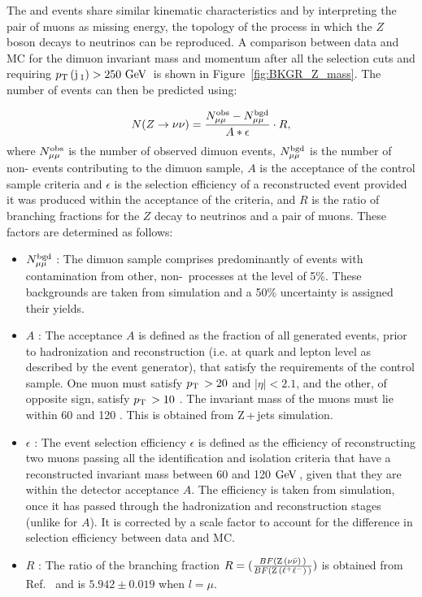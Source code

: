 The \zmumu and \znunu events share similar kinematic characteristics and by interpreting the pair of muons as missing energy, the topology of the process in which the $Z$ boson decays to neutrinos can be reproduced.  
A comparison between data and MC for the dimuon invariant mass and momentum after all the selection cuts and requiring $p_{\text{T}}\,({\rm j}\,_1)>250~\mathrm{GeV}\,$ is shown in Figure~\ref{fig:BKGR_Z_mass}.
The number of \znunu events can then be predicted using:

\begin{equation}
N(Z\rightarrow\nu\nu) = \frac{N^{\rm obs}_{\mu\mu} - N^{\rm bgd}_{\mu\mu}}{A*\epsilon}\cdot R ,
\label{eq:znunudatadriven}
\end{equation}
where $N^{\rm obs}_{\mu\mu}$ is the number of observed dimuon events, $N^{\rm bgd}_{\mu\mu}$ is the number of non-\zmumubr{} events contributing to the dimuon sample, $A$ is the acceptance of the control sample criteria and $\epsilon$ is the selection efficiency of a reconstructed event provided it was produced within the acceptance of the criteria, and $R$ is the ratio of branching fractions for the $Z$ decay to neutrinos and a pair of muons. These factors are determined as follows:
\begin{itemize}

\item $ N^{\rm bgd}_{\mu\mu}$ : The dimuon sample comprises predominantly of \zmumu events with contamination from other, non-\zmumubr\, processes at the level of 5\%. These backgrounds are taken from simulation and a 50\% uncertainty is assigned their yields. 

\item $A$ : The acceptance $A$ is defined as the fraction of all generated events, prior to hadronization and reconstruction 
(i.e. at quark and lepton level as described by the event generator), that satisfy the requirements of the control sample. 
One muon must satisfy $p_{\text{T}}\, > 20$ \GeV and $|\eta| < 2.1$, and the other, of opposite sign, satisfy $p_{\text{T}}\, > 10$ \GeV. The invariant mass of the muons must lie within 60 \GeV and 120 \GeV. This is obtained from Z\,+\,jets simulation.

\item $\epsilon$ : The event selection efficiency $\epsilon$ is defined as the efficiency of reconstructing two muons passing all the identification and isolation criteria that have a reconstructed invariant mass between 60 and 120 $\mathrm{GeV}\,$, given that they are within the detector acceptance $A$. 
The efficiency is taken from simulation, once it has passed through the hadronization and reconstruction stages (unlike for $A$).
It is corrected by a scale factor to account for the difference in selection efficiency between data and MC.

\item $R$ : The ratio of the branching fraction $R = (\frac{BF(\mathrm{Z}\, ( \nu \bar{\nu} )\,)}{BF(\mathrm{Z}\, ( \ell^{+} \ell^{-} )\,)})$ is obtained from Ref.~\cite{PDG} and 
   is $5.942\pm 0.019$ when $l=\mu$. 
\end{itemize}
 
